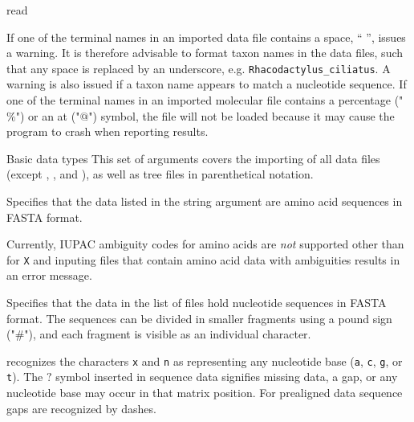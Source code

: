 \begin{command}{read}{}
\begin{arguments}
        \begin{statement}
             If one of the terminal names in an imported data file contains
             a space, `` '', \poy issues a warning. It is therefore advisable to format taxon 
             names in the data files, such that any space is replaced by an underscore, e.g. 
             \texttt{Rhacodactylus\_ciliatus}. A warning is also issued if a taxon name appears to match a 
             nucleotide sequence.  If one of the terminal names in an imported molecular 
             file contains a percentage ("$\%$") or an at ("$@$") symbol, the file will not be loaded 
             because it may cause the program to crash when reporting results.
                          
         \end{statement}

	\begin{argumentgroup}{Basic data types}
	This set of arguments covers the importing of all data files  (except , 
	,  and ),
	 as well as tree files in parenthetical notation.
	
                {Specifies that the data listed in the string argument
                are amino acid sequences in FASTA format.} {}
            
	        \begin{statement}
                Currently, IUPAC ambiguity codes for amino acids are \emph{not}
                supported other than for \texttt{X} and inputing files that contain amino acid data with
                ambiguities results in an error message.
            \end{statement}
           
            {Specifies that the data in the list of files hold nucleotide
            sequences in FASTA format. The sequences can be divided in smaller
            fragments using a pound sign ("\#"), and each fragment is visible as an
            individual character.} 
            {}
            
             \begin{statement}
                \poy recognizes the characters \texttt{x} and \texttt{n} as
                representing any nucleotide base (\texttt{a}, \texttt{c}, \texttt{g}, 
                or \texttt{t}).  The \texttt{$?$} symbol inserted in sequence data 
                signifies missing data, a gap, or any nucleotide base may occur in 
                that matrix position. For prealigned data sequence gaps are recognized 
                by dashes.
            \end{statement}
            

\end{argumentgroup}
\end{arguments}
\end{command}
